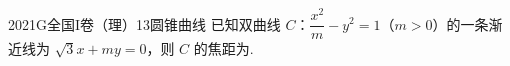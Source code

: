 
\begin{problem}{2021}{G}{全国I卷（理）}{13}{圆锥曲线}
已知双曲线 $ C $：$ \dfrac{x^2}{m}-y^2=1 $（$ m>0 $）的一条渐近线为 $ \sqrt{3}x+my=0 $，则 $ C $ 的焦距为\underline{\hspace{4em}}.
\end{problem}

\begin{answer}

\end{answer}

\begin{solutions}

\end{solutions}